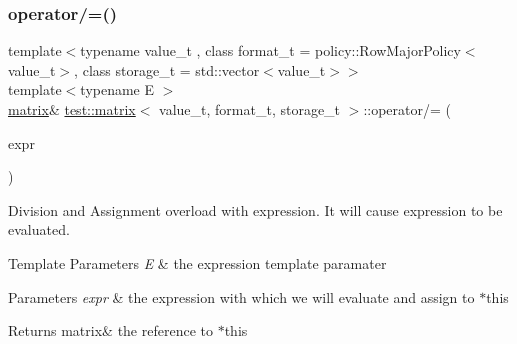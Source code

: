 \subsubsection{\texorpdfstring{operator/=()}{operator/=()}}
{\footnotesize\ttfamily template$<$typename value\+\_\+t , class format\+\_\+t  = policy\+::\+Row\+Major\+Policy$<$value\+\_\+t$>$, class storage\+\_\+t  = std\+::vector$<$value\+\_\+t$>$$>$ \\
template$<$typename E $>$ \\
\mbox{\hyperlink{classtest_1_1matrix}{matrix}}\& \mbox{\hyperlink{classtest_1_1matrix}{test\+::matrix}}$<$ value\+\_\+t, format\+\_\+t, storage\+\_\+t $>$\+::operator/= (\begin{DoxyParamCaption}\item[{\mbox{\hyperlink{classtest_1_1expression}{expression}}$<$ E $>$ const \&}]{expr }\end{DoxyParamCaption})\hspace{0.3cm}{\ttfamily [inline]}}



Division and Assignment overload with expression. It will cause expression to be evaluated. 


\begin{DoxyTemplParams}{Template Parameters}
{\em E} & the expression template paramater \\
\hline
\end{DoxyTemplParams}

\begin{DoxyParams}{Parameters}
{\em expr} & the expression with which we will evaluate and assign to $\ast$this \\
\hline
\end{DoxyParams}
\begin{DoxyReturn}{Returns}
matrix\& the reference to $\ast$this 
\end{DoxyReturn}
\mbox{\label{classtest_1_1matrix_ada18ba8ec2867844a1054b42e26ce13b}} 
